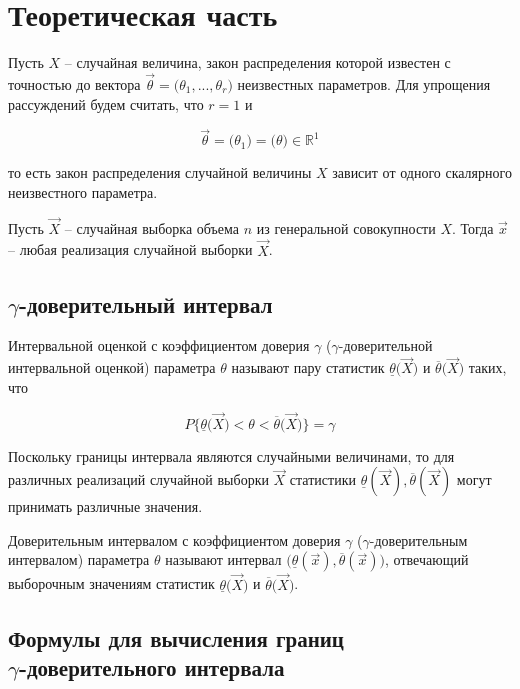 \chapter{Теоретическая часть}

Пусть $X$ -- случайная величина, закон распределения которой известен с точностью до вектора $\vec \theta = \big( \theta_1, ..., \theta_r \big)$ неизвестных параметров. Для упрощения рассуждений будем считать, что $r = 1$ и

\begin{equation*}
    \vec \theta = \big( \theta_1 \big) = \big( \theta \big) \in \mathbb{R}^1
\end{equation*}

то есть закон распределения случайной величины $X$ зависит от одного скалярного неизвестного параметра.

Пусть $\vec X$ -- случайная выборка объема $n$ из генеральной совокупности $X$. Тогда $\vec x$ -- любая реализация случайной выборки $\vec X$.

\section{$\gamma$-доверительный интервал}

Интервальной оценкой с коэффициентом доверия $\gamma$ ($\gamma$-доверительной интервальной оценкой) параметра $\theta$ называют пару статистик $\underline{\theta} \big( \vec X \big)$ и $\overline{\theta} \big( \vec X \big)$ таких, что

\begin{equation*}
    P \bigg\{ \underline{\theta} \big( \vec X \big) < \theta < \overline{\theta} \big( \vec X \big) \bigg\} = \gamma
\end{equation*}

Поскольку границы интервала являются случайными величинами, то для различных реализаций случайной выборки $\vec X$ статистики $\underline{\theta}(\vec X), \overline{\theta}(\vec X)$ могут принимать различные значения.

Доверительным интервалом с коэффициентом доверия $\gamma$ ($\gamma$-доверительным интервалом) параметра $\theta$ называют интервал $\big( \underline{\theta} (\vec x),\overline{\theta} (\vec x) \big)$, отвечающий выборочным значениям статистик $\underline{\theta} \big( \vec X \big)$ и $\overline{\theta} \big( \vec X \big)$.

\section{Формулы для вычисления границ \\ $\gamma$-доверительного интервала}

